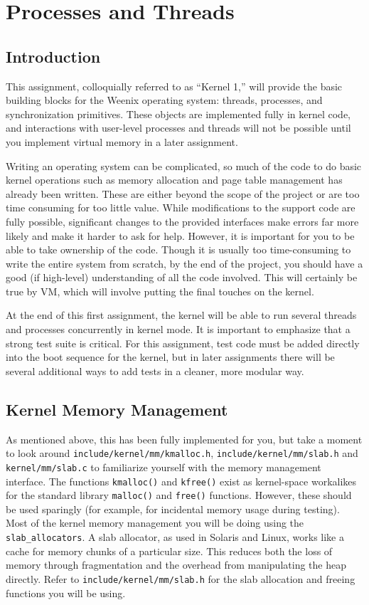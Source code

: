 \chapter{Processes and Threads}
\label{kern1}

\section{Introduction}

This assignment, colloquially referred to as ``Kernel 1,'' will provide the basic building blocks for the Weenix operating system: threads, processes, and synchronization primitives. These objects are implemented fully in kernel code, and interactions with user-level processes and threads will not be possible until you implement virtual memory in a later assignment.

Writing an operating system can be complicated, so much of the code to do basic kernel operations such as memory allocation and page table management has already been written. These are either beyond the scope of the project or are too time consuming for too little value. While modifications to the support code are fully possible, significant changes to the provided interfaces make errors far more likely and make it harder to ask for help. However, it is important for you to be able to take ownership of the code. Though it is usually too time-consuming to write the entire system from scratch, by the end of the project, you should have a good (if high-level) understanding of all the code involved. This will certainly be true by VM, which will involve putting the final touches on the kernel.

At the end of this first assignment, the kernel will be able to run several threads and processes concurrently in kernel mode. It is important to emphasize that a strong test suite is critical. For this assignment, test code must be added directly into the boot sequence for the kernel, but in later assignments there will be several additional ways to add tests in a cleaner, more modular way.

\section{Kernel Memory Management}

As mentioned above, this has been fully implemented for you, but take a moment to look around \texttt{include/kernel/mm/kmalloc.h}, \texttt{include/kernel/mm/slab.h} and \texttt{kernel/mm/slab.c} to familiarize yourself with the memory management interface. The functions \texttt{kmalloc()} and \texttt{kfree()} exist as kernel-space workalikes for the standard library \texttt{malloc()} and \texttt{free()} functions. However, these should be used sparingly (for example, for incidental memory usage during testing). Most of the kernel memory management you will be doing using the \texttt{slab\_allocators}. A slab allocator, as used in Solaris and Linux, works like a cache for memory chunks of a particular size. This reduces both the loss of memory through fragmentation and the overhead from manipulating the heap directly. Refer to \texttt{include/kernel/mm/slab.h} for the slab allocation and freeing functions you will be using.

